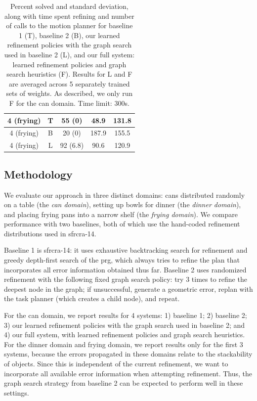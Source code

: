 \begin{table}[t]
{\begin{tabular}{ccccc}
    \midrule[1.5pt]
      4 (frying) & T & 55 (0) & 48.9 & 131.8\\
    \midrule
      4 (frying) & B & 20 (0) & 187.9 & 155.5\\
    \midrule
      4 (frying) & L & 92 (6.8) & 90.6 & 120.9\\
    \bottomrule[1.5pt]
  \end{tabular}}
  \caption{\small{Percent solved and standard deviation, along with time spent refining and number of calls to the motion
planner for baseline 1 (T), baseline 2 (B), our learned refinement policies with the graph search used in baseline 2 (L),
and our full system: learned refinement policies and graph search heuristics (F). Results for L and F
are averaged across 5 separately trained sets of weights. As described, we only run F for the can domain. Time limit: 300s.}}
  \label{table:results}
  \vspace{-1em}
\end{table}

\subsection{Methodology}
We evaluate our approach in three distinct domains: cans distributed randomly on a table (the \emph{can domain}),
setting up bowls for dinner (the \emph{dinner domain}), and placing frying pans into a narrow shelf (the \emph{frying domain}).
We compare performance with two baselines, both of which use the hand-coded refinement distributions used in {\sc sfrcra-14}.

Baseline 1 is {\sc sfrcra-14}: it uses exhaustive backtracking search for refinement
and greedy depth-first search of the {\sc prg}, which always tries to refine
the plan that incorporates all error information obtained thus far.
Baseline 2 uses randomized refinement with the following fixed graph search policy: try 3 times to refine the deepest
node in the graph; if unsuccessful, generate a geometric error, replan with the task planner (which creates a child node), and repeat.

For the can domain, we report results for 4 systems: 1) baseline 1; 2) baseline 2; 3) our learned refinement policies
with the graph search used in baseline 2; and 4) our full system, with learned refinement policies and graph search heuristics.
For the dinner domain and frying domain, we report results only for the first 3 systems, because the errors propagated in these
domains relate to the stackability of objects. Since this is independent of the current refinement, we want to
incorporate all available error information when attempting refinement. Thus, the graph search strategy
from baseline 2 can be expected to perform well in these settings.

